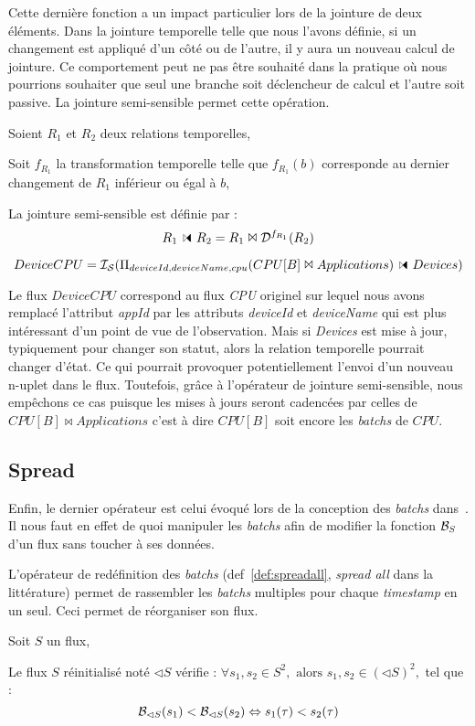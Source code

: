 Cette dernière fonction a un impact particulier lors de la jointure de deux éléments. Dans la jointure temporelle telle que nous l'avons définie, si un changement est appliqué d'un côté ou de l'autre, il y aura un nouveau calcul de jointure. Ce comportement peut ne pas être souhaité dans la pratique où nous pourrions souhaiter que seul une branche soit déclencheur de calcul et l'autre soit passive. La jointure semi-sensible permet cette opération.


\begin{defi}
    Soient $R_1$ et $R_2$ deux relations temporelles,

    Soit $f_{R_1}$ la transformation temporelle telle que $f_{R_1}(b)$ corresponde au dernier changement de $R_1$ inférieur ou égal à $b$,

    La jointure semi-sensible est définie par :
        $$R_1\ssjoin R_2 = R_1 \Join \D^{f_{R_1}}(R_2)$$
\end{defi}
\begin{example}
    $$DeviceCPU=\IS(\Pi_{deviceId,deviceName,cpu}(CPU[B]\Join Applications)\ssjoin Devices)$$

Le flux $DeviceCPU$ correspond au flux \textit{CPU} originel sur lequel nous avons remplacé l'attribut \textit{appId} par les attributs \textit{deviceId} et \textit{deviceName} qui est plus intéressant d'un point de vue de l'observation. Mais si \textit{Devices} est mise à jour, typiquement pour changer son statut, alors la relation temporelle pourrait changer d'état. Ce qui pourrait provoquer potentiellement l'envoi d'un nouveau n-uplet dans le flux. Toutefois, grâce à l'opérateur de jointure semi-sensible, nous empêchons ce cas puisque les mises à jours seront cadencées par celles de $CPU[B]\Join Applications$ c'est à dire $CPU[B]$ soit encore les \textit{batchs} de $CPU$.
\end{example}

\subsection{Spread}
Enfin, le dernier opérateur est celui évoqué lors de la conception des \textit{batchs} dans~\cite{Jain:spread}. Il nous faut en effet de quoi manipuler les \textit{batchs} afin de modifier la fonction $\mathcal{B}_S$ d'un flux sans toucher à ses données.

L'opérateur de redéfinition des \textit{batchs} (def~\ref{def:spreadall}, \textit{spread all} dans la littérature) permet de rassembler les \textit{batchs} multiples pour chaque \textit{timestamp} en un seul. Ceci permet de réorganiser son flux.
\begin{defi}\label{def:spreadall}
Soit $S$ un flux,

Le flux $S$ réinitialisé noté $\lhd S$ vérifie :
$\forall s_1, s_2\in S^2, \textrm{ alors } s_1, s_2 \in (\lhd S)^2,$ tel que :
$$\mathcal{B}_{\lhd S}(s_1) < \mathcal{B}_{\lhd S}(s_2) \Leftrightarrow s_1(\tau) < s_2(\tau)$$
\end{defi}

